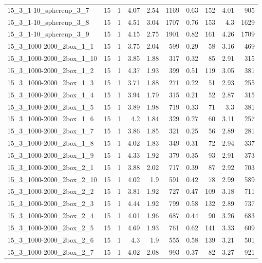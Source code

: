 \begin{center}
\begin{scriptsize}
\begin{longtable}{lrrrrrrrrr}
15\_3\_1-10\_sphereup\_3\_7 & 15 & 1 & 4.07 & 2.54 & 1169 & 0.63 & 152 & 4.01 & 905\\
15\_3\_1-10\_sphereup\_3\_8 & 15 & 1 & 4.51 & 3.04 & 1707 & 0.76 & 153 & 4.3 & 1629\\
15\_3\_1-10\_sphereup\_3\_9 & 15 & 1 & 4.15 & 2.75 & 1901 & 0.82 & 161 & 4.26 & 1709\\
15\_3\_1000-2000\_2box\_1\_1 & 15 & 1 & 3.75 & 2.04 & 599 & 0.29 & 58 & 3.16 & 469\\
15\_3\_1000-2000\_2box\_1\_10 & 15 & 1 & 3.85 & 1.88 & 317 & 0.32 & 85 & 2.91 & 315\\
15\_3\_1000-2000\_2box\_1\_2 & 15 & 1 & 4.37 & 1.93 & 399 & 0.51 & 119 & 3.05 & 381\\
15\_3\_1000-2000\_2box\_1\_3 & 15 & 1 & 3.71 & 1.88 & 271 & 0.22 & 51 & 2.93 & 255\\
15\_3\_1000-2000\_2box\_1\_4 & 15 & 1 & 3.94 & 1.79 & 315 & 0.21 & 52 & 2.87 & 315\\
15\_3\_1000-2000\_2box\_1\_5 & 15 & 1 & 3.89 & 1.98 & 719 & 0.33 & 71 & 3.3 & 381\\
15\_3\_1000-2000\_2box\_1\_6 & 15 & 1 & 4.2 & 1.84 & 329 & 0.27 & 60 & 3.11 & 257\\
15\_3\_1000-2000\_2box\_1\_7 & 15 & 1 & 3.86 & 1.85 & 321 & 0.25 & 56 & 2.89 & 281\\
15\_3\_1000-2000\_2box\_1\_8 & 15 & 1 & 4.02 & 1.83 & 349 & 0.31 & 72 & 2.94 & 337\\
15\_3\_1000-2000\_2box\_1\_9 & 15 & 1 & 4.33 & 1.92 & 379 & 0.35 & 93 & 2.91 & 373\\
15\_3\_1000-2000\_2box\_2\_1 & 15 & 1 & 3.88 & 2.02 & 717 & 0.39 & 87 & 2.92 & 703\\
15\_3\_1000-2000\_2box\_2\_10 & 15 & 1 & 4.02 & 1.9 & 591 & 0.42 & 78 & 2.99 & 589\\
15\_3\_1000-2000\_2box\_2\_2 & 15 & 1 & 3.81 & 1.92 & 727 & 0.47 & 109 & 3.18 & 711\\
15\_3\_1000-2000\_2box\_2\_3 & 15 & 1 & 4.44 & 1.92 & 799 & 0.58 & 132 & 2.89 & 737\\
15\_3\_1000-2000\_2box\_2\_4 & 15 & 1 & 4.01 & 1.96 & 687 & 0.44 & 90 & 3.26 & 683\\
15\_3\_1000-2000\_2box\_2\_5 & 15 & 1 & 4.69 & 1.93 & 761 & 0.62 & 141 & 3.33 & 609\\
15\_3\_1000-2000\_2box\_2\_6 & 15 & 1 & 4.3 & 1.9 & 555 & 0.58 & 139 & 3.21 & 501\\
15\_3\_1000-2000\_2box\_2\_7 & 15 & 1 & 4.02 & 2.08 & 993 & 0.37 & 82 & 3.27 & 921\\

\end{longtable}
\end{scriptsize}
\end{center}
